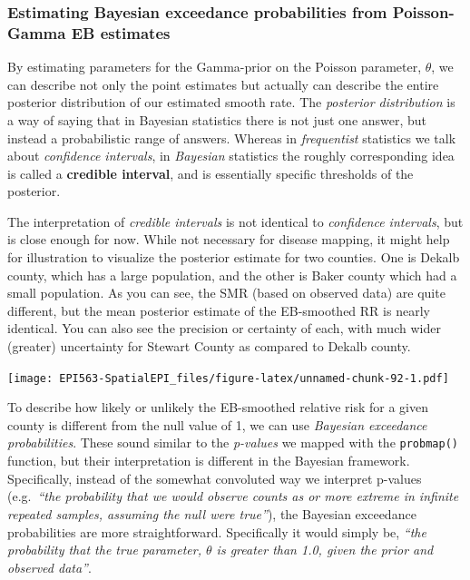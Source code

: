 \documentclass[
]{book}
\newcommand{\passthrough}[1]{#1}
\begin{document}
\hypertarget{estimating-bayesian-exceedance-probabilities-from-poisson-gamma-eb-estimates}{%
\subsubsection{Estimating Bayesian exceedance probabilities from Poisson-Gamma EB estimates}\label{estimating-bayesian-exceedance-probabilities-from-poisson-gamma-eb-estimates}}

By estimating parameters for the Gamma-prior on the Poisson parameter, \(\theta\), we can describe not only the point estimates but actually can describe the entire posterior distribution of our estimated smooth rate. The \emph{posterior distribution} is a way of saying that in Bayesian statistics there is not just one answer, but instead a probabilistic range of answers. Whereas in \emph{frequentist} statistics we talk about \emph{confidence intervals}, in \emph{Bayesian} statistics the roughly corresponding idea is called a \textbf{credible interval}, and is essentially specific thresholds of the posterior.

The interpretation of \emph{credible intervals} is not identical to \emph{confidence intervals}, but is close enough for now. While not necessary for disease mapping, it might help for illustration to visualize the posterior estimate for two counties. One is Dekalb county, which has a large population, and the other is Baker county which had a small population. As you can see, the SMR (based on observed data) are quite different, but the mean posterior estimate of the EB-smoothed RR is nearly identical. You can also see the precision or certainty of each, with much wider (greater) uncertainty for Stewart County as compared to Dekalb county.

\texttt{[image: EPI563-SpatialEPI\_files/figure-latex/unnamed-chunk-92-1.pdf]}

To describe how likely or unlikely the EB-smoothed relative risk for a given county is different from the null value of 1, we can use \emph{Bayesian exceedance probabilities}. These sound similar to the \emph{p-values} we mapped with the \passthrough{\lstinline!probmap()!} function, but their interpretation is different in the Bayesian framework. Specifically, instead of the somewhat convoluted way we interpret p-values (e.g.~\emph{``the probability that we would observe counts as or more extreme in infinite repeated samples, assuming the null were true''}), the Bayesian exceedance probabilities are more straightforward. Specifically it would simply be, \emph{``the probability that the true parameter, \(\theta\) is greater than 1.0, given the prior and observed data''}.
\end{document}
